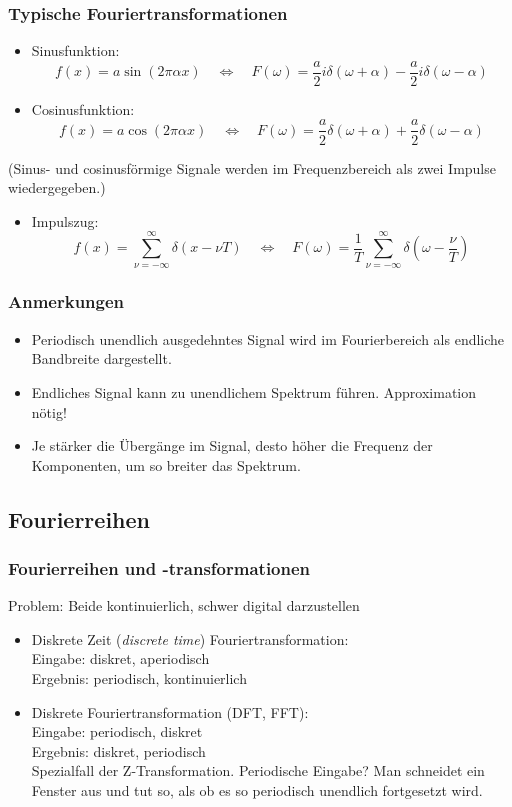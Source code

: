 \subsubsection*{Typische Fouriertransformationen}
\begin{itemize}
\item Sinusfunktion: $$f(x) = a \sin(2 \pi \alpha x) \quad \Leftrightarrow \quad F(\omega) = \frac{a}{2}i \delta(\omega + \alpha) - \frac{a}{2}i \delta(\omega - \alpha)$$
\item Cosinusfunktion: $$f(x) = a \cos(2 \pi \alpha x) \quad \Leftrightarrow \quad F(\omega) = \frac{a}{2} \delta(\omega + \alpha) + \frac{a}{2} \delta(\omega - \alpha)$$
\end{itemize}
(Sinus- und cosinusförmige Signale werden im Frequenzbereich als zwei Impulse wiedergegeben.)
\begin{itemize}
\item Impulszug: $$f(x) = \sum\limits_{\nu = -\infty}^{\infty} \delta(x - \nu T) \quad \Leftrightarrow \quad F(\omega) = \frac{1}{T} \sum\limits_{\nu = -\infty}^{\infty} \delta(\omega - \frac{\nu}{T})$$
\end{itemize}

\subsubsection*{Anmerkungen}
\begin{itemize}
\item Periodisch unendlich ausgedehntes Signal wird im Fourierbereich als endliche Bandbreite dargestellt.
\item Endliches Signal kann zu unendlichem Spektrum führen. Approximation nötig!
\item Je stärker die Übergänge im Signal, desto höher die Frequenz der Komponenten, um so breiter das Spektrum.
\end{itemize}

\subsection{Fourierreihen}

\subsubsection*{Fourierreihen und -transformationen}
Problem: Beide kontinuierlich, schwer digital darzustellen
\begin{itemize}
\item Diskrete Zeit (\textsl{discrete time}) Fouriertransformation: \\ Eingabe: diskret, aperiodisch \\ Ergebnis: periodisch, kontinuierlich
\item Diskrete Fouriertransformation (DFT, FFT): \\ Eingabe: periodisch, diskret \\ Ergebnis: diskret, periodisch \\ Spezialfall der Z-Transformation. Periodische Eingabe? Man schneidet ein Fenster aus und tut so, als ob es so periodisch unendlich fortgesetzt wird.
\end{itemize}

